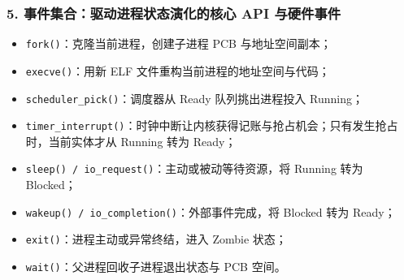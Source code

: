 \documentclass[11pt,a4paper,openany]{ctexbook}
\begin{document}
\subsubsection*{5. 事件集合：驱动进程状态演化的核心 API 与硬件事件}
\begin{itemize}
  \item \texttt{fork()}：克隆当前进程，创建子进程 PCB 与地址空间副本；
  \item \texttt{execve()}：用新 ELF 文件重构当前进程的地址空间与代码；
  \item \texttt{scheduler\_pick()}：调度器从 Ready 队列挑出进程投入 Running；
  \item \texttt{timer\_interrupt()}：时钟中断让内核获得记账与抢占机会；只有发生抢占时，当前实体才从 Running 转为 Ready；
  \item \texttt{sleep() / io\_request()}：主动或被动等待资源，将 Running 转为 Blocked；
  \item \texttt{wakeup() / io\_completion()}：外部事件完成，将 Blocked 转为 Ready；
  \item \texttt{exit()}：进程主动或异常终结，进入 Zombie 状态；
  \item \texttt{wait()}：父进程回收子进程退出状态与 PCB 空间。
\end{itemize}
\end{document}
